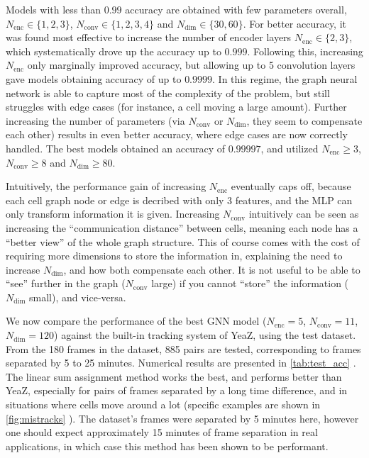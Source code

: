\documentclass[10pt,conference,compsocconf,a4paper]{IEEEtran}
\newcommand*{\shortautoref}[1]{%
	\begingroup
	\def\equationautorefname{\textsc{Eq.}}%
	\def\tableautorefname{\textsc{Tab.}}%
	\def\figureautorefname{\textsc{Fig.}}%
	\autoref{#1}%
	\endgroup
}
\begin{document}
		Models with less than $0.99$ accuracy are obtained with few parameters overall, $N_\textrm{enc} \in \{1,2,3\}$, $N_\textrm{conv} \in \{1,2,3,4\}$ and $N_\textrm{dim} \in \{30, 60\}$. For better accuracy, it was found most effective to increase the number of encoder layers $N_\textrm{enc} \in \{2,3\}$, which systematically drove up the accuracy up to $0.999$. Following this, increasing $N_\textrm{enc}$ only marginally improved accuracy, but allowing up to 5 convolution layers gave models obtaining accuracy of up to $0.9999$. In this regime, the graph neural network is able to capture most of the complexity of the problem, but still struggles with edge cases (for instance, a cell moving a large amount). Further increasing the number of parameters (via $N_\textrm{conv}$ or $N_\textrm{dim}$, they seem to compensate each other) results in even better accuracy, where edge cases are now correctly handled. The best models obtained an accuracy of $0.99997$, and utilized $N_\textrm{enc} \geq 3$, $N_\textrm{conv} \geq 8$ and $N_\textrm{dim} \geq 80$.

		Intuitively, the performance gain of increasing $N_\textrm{enc}$ eventually caps off, because each cell graph node or edge is decribed with only 3 features, and the MLP can only transform information it is given. Increasing $N_\textrm{conv}$ intuitively can be seen as increasing the ``communication distance'' between cells, meaning each node has a ``better view'' of the whole graph structure. This of course comes with the cost of requiring more dimensions to store the information in, explaining the need to increase $N_\textrm{dim}$, and how both compensate each other. It is not useful to be able to ``see'' further in the graph ($N_\textrm{conv}$ large) if you cannot ``store'' the information ($N_\textrm{dim}$ small), and vice-versa.

		We now compare the performance of the best GNN model ($N_\textrm{enc}=5$, $N_\textrm{conv}=11$, $N_\textrm{dim}=120$) against the built-in tracking system of YeaZ, using the test dataset. From the 180 frames in the dataset, 885 pairs are tested, corresponding to frames separated by 5 to 25 minutes. Numerical results are presented in \shortautoref{tab:test_acc}. The linear sum assignment method works the best, and performs better than YeaZ, especially for pairs of frames separated by a long time difference, and in situations where cells move around a lot (specific examples are shown in \shortautoref{fig:mistracks}). The dataset's frames were separated by 5 minutes here, however one should expect approximately 15 minutes of frame separation in real applications, in which case this method has been shown to be performant.
\end{document}
